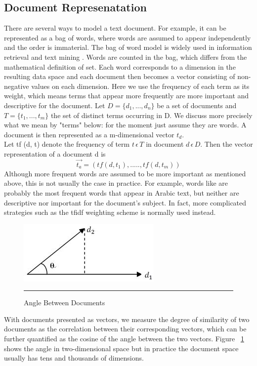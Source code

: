 \subsection{Document Represenatation}
\label {documentrep}
There are several ways to model a text document. For example, it can be represented as a bag of words, where words are assumed to appear independently and the order is immaterial. The bag of word model is widely used in information retrieval and text mining . Words are counted in the bag, which differs from the mathematical definition of set. Each word corresponds to a dimension in the resulting data space and each document then becomes a  vector consisting of non-negative values on each dimension. Here we use the frequency of each term as its weight, which means terms that appear more frequently are more important and descriptive for the document.
Let $D = \{d_1 , . . . , d_n \}$ be a set of documents and $T = \{t_1 , . . . ,t_m \}$ the set of distinct terms occurring in D. We discuss more precisely what we mean by "terms" below: for the moment just assume they are words. A document is then represented as a m-dimensional vector $t_d$.\\
Let tf (d, t) denote the frequency of term $t \,\epsilon\, T$ in document $d \, \epsilon\, D$. Then the vector representation of a document d is
\begin{equation}
\vec{t_{a}} = (tf(d,t_1),.....,tf(d,t_m))
\end{equation}
Although more frequent words are assumed to be more important as mentioned above, this is not usually the case in practice. For example, words like  are probably the most frequent words that appear in Arabic text, but neither are descriptive nor important for the document’s subject. In fact, more complicated strategies such as the tfidf weighting scheme is normally used instead\citep{tfidf}.
\begin{figure}[htbp]
	\centering
		\includegraphics{./Figures/a.png}
		\rule{35em}{0.5pt}
	\caption[Angle Between Documents]{Angle Between Documents}
	\label{fig:Angle_Between_Documents}
\end{figure}
With documents presented as vectors, we measure the degree of similarity of two documents as the correlation between their corresponding vectors, which can be further quantified as the cosine of the angle between the two vectors.
Figure ~\ref{fig:Angle_Between_Documents} shows the angle in two-dimensional space but in practice the document space usually has tens and thousands of dimensions\citep{lexical}.

